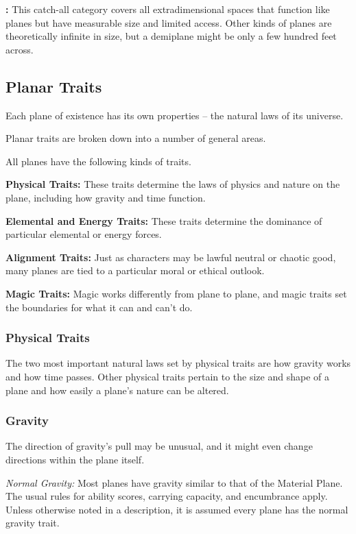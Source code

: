 \textbf{:} This catch-all category covers all extradimensional spaces 
that function like planes but have measurable size and limited access. Other kinds 
of planes are theoretically infinite in size, but a demiplane might be only a few 
hundred feet across.

\subsection{Planar Traits}

Each plane of existence has its own properties -- the natural laws of its universe.

Planar traits are broken down into a number of general areas.

All planes have the following kinds of traits.

\textbf{Physical Traits:} These traits determine the laws of physics and nature 
on the plane, including how gravity and time function.

\textbf{Elemental and Energy Traits:} These traits determine the dominance of particular 
elemental or energy forces.

\textbf{Alignment Traits:} Just as characters may be lawful neutral or chaotic 
good, many planes are tied to a particular moral or ethical outlook.

\textbf{Magic Traits:} Magic works differently from plane to plane, and magic traits 
set the boundaries for what it can and can't do.

\subsubsection{Physical Traits}

The two most important natural laws set by physical traits are how gravity works 
and how time passes. Other physical traits pertain to the size and shape of a plane 
and how easily a plane's nature can be altered.

\subsubsection{Gravity}

The direction of gravity's pull may be unusual, and it might 
even change directions within the plane itself.

\textit{Normal Gravity:} Most planes have gravity similar to that of the Material 
Plane. The usual rules for ability scores, carrying capacity, and encumbrance apply. 
Unless otherwise noted in a description, it is assumed every plane has the normal 
gravity trait.

